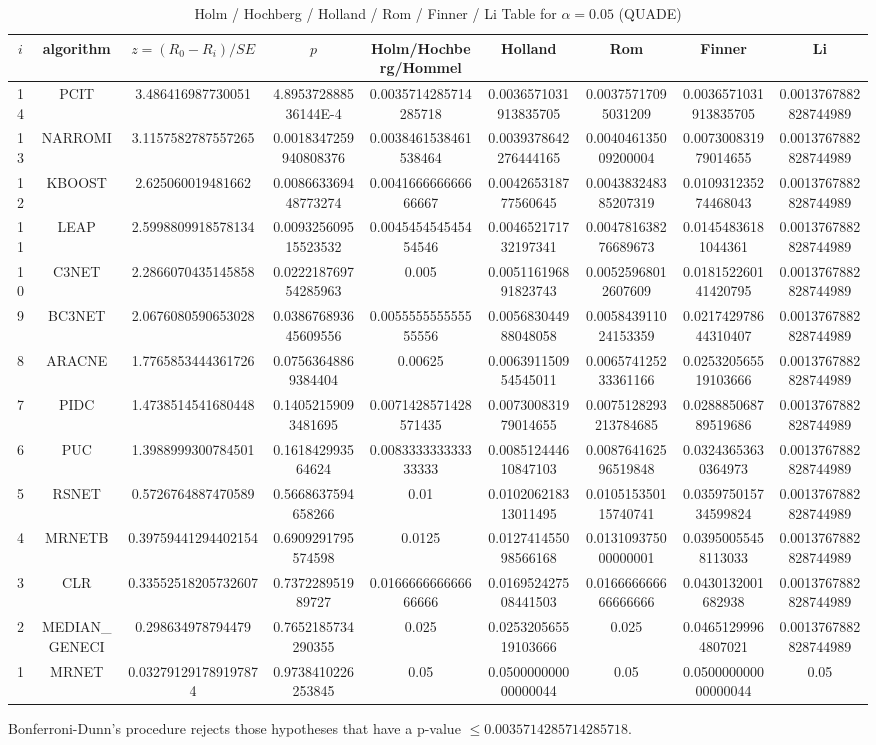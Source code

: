 \documentclass[a4paper,10pt]{article}
\begin{document}
\begin{landscape}
\begin{table}[!htp]
\centering\scriptsize
\caption{Holm / Hochberg / Holland / Rom / Finner / Li Table for $\alpha=0.05$ (QUADE)}
\begin{tabular}{ccccccccc}
$i$&algorithm&$z=(R_0 - R_i)/SE$&$p$&Holm/Hochberg/Hommel&Holland&Rom&Finner&Li\\
\hline
14&PCIT&3.486416987730051&4.895372888536144E-4&0.0035714285714285718&0.0036571031913835705&0.00375717095031209&0.0036571031913835705&0.0013767882828744989\\
13&NARROMI&3.1157582787557265&0.0018347259940808376&0.0038461538461538464&0.0039378642276444165&0.004046135009200004&0.007300831979014655&0.0013767882828744989\\
12&KBOOST&2.625060019481662&0.008663369448773274&0.004166666666666667&0.004265318777560645&0.004383248385207319&0.010931235274468043&0.0013767882828744989\\
11&LEAP&2.5998809918578134&0.009325609515523532&0.004545454545454546&0.004652171732197341&0.004781638276689673&0.01454836181044361&0.0013767882828744989\\
10&C3NET&2.2866070435145858&0.022218769754285963&0.005&0.005116196891823743&0.00525968012607609&0.018152260141420795&0.0013767882828744989\\
9&BC3NET&2.0676080590653028&0.038676893645609556&0.005555555555555556&0.005683044988048058&0.005843911024153359&0.021742978644310407&0.0013767882828744989\\
8&ARACNE&1.7765853444361726&0.07563648869384404&0.00625&0.006391150954545011&0.006574125233361166&0.025320565519103666&0.0013767882828744989\\
7&PIDC&1.4738514541680448&0.14052159093481695&0.0071428571428571435&0.007300831979014655&0.0075128293213784685&0.028885068789519686&0.0013767882828744989\\
6&PUC&1.3988999300784501&0.161842993564624&0.008333333333333333&0.008512444610847103&0.008764162596519848&0.03243653630364973&0.0013767882828744989\\
5&RSNET&0.5726764887470589&0.5668637594658266&0.01&0.010206218313011495&0.010515350115740741&0.035975015734599824&0.0013767882828744989\\
4&MRNETB&0.39759441294402154&0.6909291795574598&0.0125&0.012741455098566168&0.013109375000000001&0.03950055458113033&0.0013767882828744989\\
3&CLR&0.33552518205732607&0.737228951989727&0.016666666666666666&0.016952427508441503&0.016666666666666666&0.0430132001682938&0.0013767882828744989\\
2&MEDIAN_GENECI&0.298634978794479&0.7652185734290355&0.025&0.025320565519103666&0.025&0.04651299964807021&0.0013767882828744989\\
1&MRNET&0.032791291789197874&0.9738410226253845&0.05&0.050000000000000044&0.05&0.050000000000000044&0.05\\
\hline
\end{tabular}
\end{table}
Bonferroni-Dunn's procedure rejects those hypotheses that have a p-value $\le0.0035714285714285718$.



\end{landscape}
\end{document}
